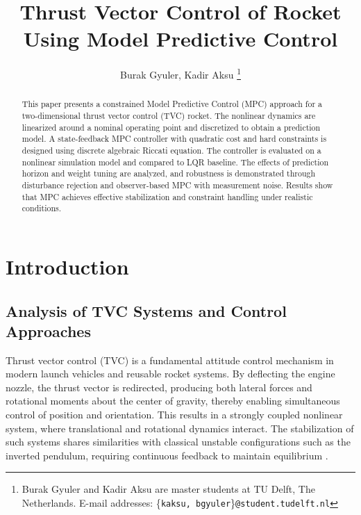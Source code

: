 \documentclass[10pt,twocolumn,twoside]{IEEEtran}
\date{ }
\begin{document}
\title{Thrust Vector Control of Rocket Using Model Predictive Control}

\author{Burak Gyuler, Kadir Aksu 
\thanks{Burak Gyuler and Kadir Aksu are master students at TU Delft, The Netherlands. 
E-mail addresses: \{\texttt{kaksu, bgyuler}\}\texttt{@student.tudelft.nl} \smallskip
}
}
\maketitle         


\begin{abstract}
This paper presents a constrained Model Predictive Control (MPC) approach for a two-dimensional thrust vector control (TVC) rocket. The nonlinear dynamics are linearized around a nominal operating point and discretized to obtain a prediction model. A state-feedback MPC controller with quadratic cost and hard constraints is designed using discrete algebraic Riccati equation. The controller is evaluated on a nonlinear simulation model and compared to LQR baseline. The effects of prediction horizon and weight tuning are analyzed, and robustness is demonstrated through disturbance rejection and observer-based MPC with measurement noise. Results show that MPC achieves effective stabilization and constraint handling under realistic conditions.
\end{abstract}

\section{Introduction} \label{sec:intro}
\subsection{Analysis of TVC Systems and Control Approaches}

Thrust vector control (TVC) is a fundamental attitude control mechanism in modern launch vehicles and reusable rocket systems. By deflecting the engine nozzle, the thrust vector is redirected, producing both lateral forces and rotational moments about the center of gravity, thereby enabling simultaneous control of position and orientation. This results in a strongly coupled nonlinear system, where translational and rotational dynamics interact. The stabilization of such systems shares similarities with classical unstable configurations such as the inverted pendulum, requiring continuous feedback to maintain equilibrium \cite{Wie1998, Greensite1970}.
\end{document}
